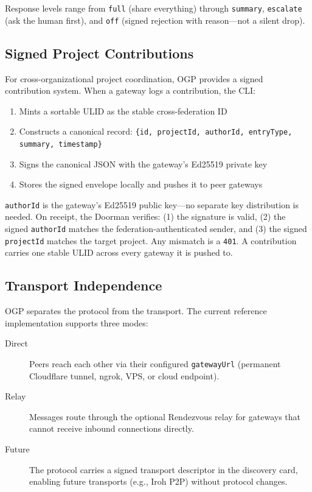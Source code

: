 \documentclass[sigconf,nonacm]{acmart}
\begin{document}
Response levels range from \texttt{full} (share everything) through
\texttt{summary}, \texttt{escalate} (ask the human first), and \texttt{off}
(signed rejection with reason---not a silent drop).

\subsection{Signed Project Contributions}

For cross-organizational project coordination, OGP provides a signed
contribution system. When a gateway logs a contribution, the CLI:

\begin{enumerate}
\item Mints a sortable ULID as the stable cross-federation ID
\item Constructs a canonical record:
  \texttt{\{id, projectId, authorId, entryType, summary, timestamp\}}
\item Signs the canonical JSON with the gateway's Ed25519 private key
\item Stores the signed envelope locally and pushes it to peer gateways
\end{enumerate}

\texttt{authorId} is the gateway's Ed25519 public key---no separate key
distribution is needed. On receipt, the Doorman verifies: (1) the signature
is valid, (2) the signed \texttt{authorId} matches the federation-authenticated
sender, and (3) the signed \texttt{projectId} matches the target project.
Any mismatch is a \texttt{401}. A contribution carries one stable ULID
across every gateway it is pushed to.

\subsection{Transport Independence}
\label{sec:transport}

OGP separates the protocol from the transport. The current reference
implementation supports three modes:

\begin{description}
\item[Direct] Peers reach each other via their configured \texttt{gatewayUrl}
  (permanent Cloudflare tunnel, ngrok, VPS, or cloud endpoint).
\item[Relay] Messages route through the optional Rendezvous relay for
  gateways that cannot receive inbound connections directly.
\item[Future] The protocol carries a signed transport descriptor in
  the discovery card, enabling future transports (e.g., Iroh P2P) without
  protocol changes.
\end{description}
\end{document}
